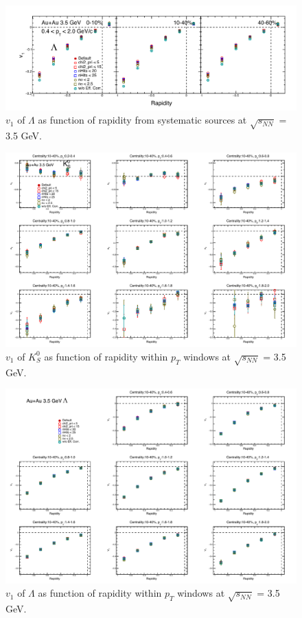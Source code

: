 \begin{figure}[hbt!]
\centering
\includegraphics[width=0.95\linewidth]{figures/chapter03/3p5gev_lam_v1y_sysUnc.pdf}
\caption{$v_1$ of $\Lambda$ as function of rapidity from systematic sources at $\sqrt{s_{NN}}$ = 3.5 GeV.}
\label{fig:3p5gev_lam_v1y_sysUnc}
\end{figure}


\begin{figure}[hbt!]
\centering
\includegraphics[width=0.95\linewidth]{figures/chapter03/3p5gev_K0s_v1yPt_sysUnc.pdf}
\caption{$v_1$ of $K^0_S$ as function of rapidity within $p_T$ windows at $\sqrt{s_{NN}}$ = 3.5 GeV.}
\label{fig:3p5gev_K0s_v1yPt_sysUnc}
\end{figure}

\begin{figure}[hbt!]
\centering
\includegraphics[width=0.95\linewidth]{figures/chapter03/3p5gev_lam_v1yPt_sysUnc.pdf}
\caption{$v_1$ of $\Lambda$ as function of rapidity within $p_T$ windows at $\sqrt{s_{NN}}$ = 3.5 GeV.}
\label{fig:3p5gev_lam_v1yPt_sysUnc}
\end{figure}

